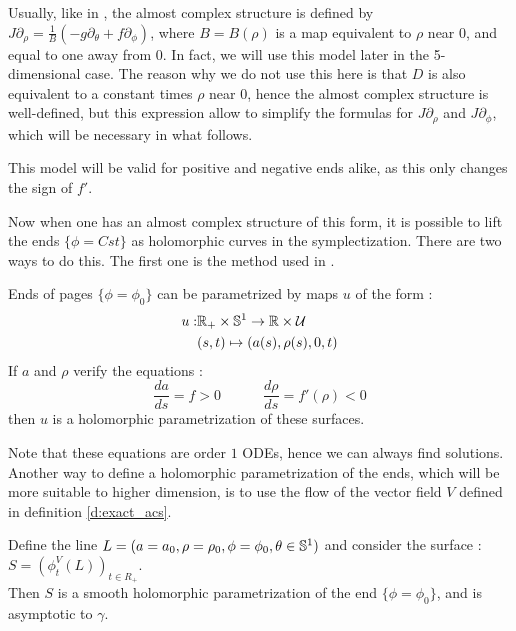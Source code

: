 \documentclass[../main.tex]{subfiles}
\begin{document}
\begin{remark}\label{r:BorD1}
Usually, like in \cite{wendl_open_2009}, the almost complex structure is defined by $J\partial_\rho = \frac{1}{B}(-g\partial_\theta+ f\partial_\phi)$, where $B = B(\rho)$ is a map equivalent to $\rho$ near $0$, and equal to one away from $0$. In fact, we will use this model later in the 5-dimensional case. The reason why we do not use this here is that $D$ is also equivalent to a constant times $\rho$ near $0$, hence the almost complex structure is well-defined, but this expression allow to simplify the formulas for $J\partial_\rho$ and $J\partial_\phi$, which will be necessary in what follows.
\end{remark}

\begin{remark}
This model will be valid for positive and negative ends alike, as this only changes the sign of $f'$.
\end{remark}

Now when one has an almost complex structure of this form, it is possible to lift the ends $\{\phi = Cst\}$ as holomorphic curves in the symplectization. There are two ways to do this. The first one is the method used in \cite{wendl_open_2009}. 

\begin{proposition}\label{prop:lift_methodCReq}
Ends of pages $\{\phi = \phi_0\}$ can be parametrized by maps $u$ of the form : 
\begin{align*}
    u :& \mathbb{R}_+\times \mathbb{S}^1\rightarrow \mathbb{R}\times \mathcal{U} \\
    & (s,t)\mapsto (a(s),\rho(s),0,t)
\end{align*}
If $a$ and $\rho$ verify the equations : 
$$\frac{da}{ds} = f>0\quad\quad\quad \frac{d\rho}{ds} = f'(\rho) < 0$$
then $u$ is a holomorphic parametrization of these surfaces.
\end{proposition}

Note that these equations are order $1$ ODEs, hence we can always find solutions.\\

Another way to define a holomorphic parametrization of the ends, which will be more suitable to higher dimension, is to use the flow of the vector field $V$ defined in definition \ref{d:exact_acs}.

\begin{proposition}\label{prop:lift_methodFLOW}
Define the line $L = (a = a_0,\rho = \rho_0,\phi = \phi_0,\theta\in \mathbb{S}^1)$ and consider the surface : $S = (\phi_t^V(L))_{t\in R_+}$. \\Then $S$ is a smooth holomorphic parametrization of the end $\{\phi = \phi_0\}$, and is asymptotic to $\gamma$.\\
\end{proposition}
\end{document}
